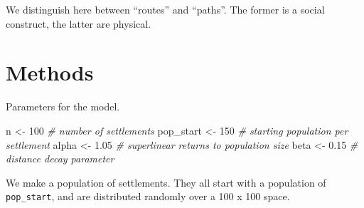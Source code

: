 \documentclass[]{elsarticle} %
\newenvironment{Shaded}{\begin{snugshade}}{\end{snugshade}}
\newcommand{\KeywordTok}[1]{\textcolor[rgb]{0.13,0.29,0.53}{\textbf{{#1}}}}
\newcommand{\DataTypeTok}[1]{\textcolor[rgb]{0.13,0.29,0.53}{{#1}}}
\newcommand{\DecValTok}[1]{\textcolor[rgb]{0.00,0.00,0.81}{{#1}}}
\newcommand{\FloatTok}[1]{\textcolor[rgb]{0.00,0.00,0.81}{{#1}}}
\newcommand{\StringTok}[1]{\textcolor[rgb]{0.31,0.60,0.02}{{#1}}}
\newcommand{\CommentTok}[1]{\textcolor[rgb]{0.56,0.35,0.01}{\textit{{#1}}}}
\newcommand{\NormalTok}[1]{{#1}}
\begin{document}
We distinguish here between ``routes'' and ``paths''. The former is a
social construct, the latter are physical.

\section{Methods}\label{methods}

Parameters for the model.

\begin{Shaded}
\begin{Highlighting}[]
\NormalTok{n <-}\StringTok{ }\DecValTok{100} \CommentTok{# number of settlements}
\NormalTok{pop_start <-}\StringTok{ }\DecValTok{150} \CommentTok{# starting population per settlement}
\NormalTok{alpha <-}\StringTok{ }\FloatTok{1.05} \CommentTok{# superlinear returns to population size}
\NormalTok{beta <-}\StringTok{ }\FloatTok{0.15} \CommentTok{# distance decay parameter}
\end{Highlighting}
\end{Shaded}

We make a population of settlements. They all start with a population of
\texttt{pop\_start}, and are distributed randomly over a 100 x 100
space.

\begin{Shaded}
\end{Shaded}
\end{document}
